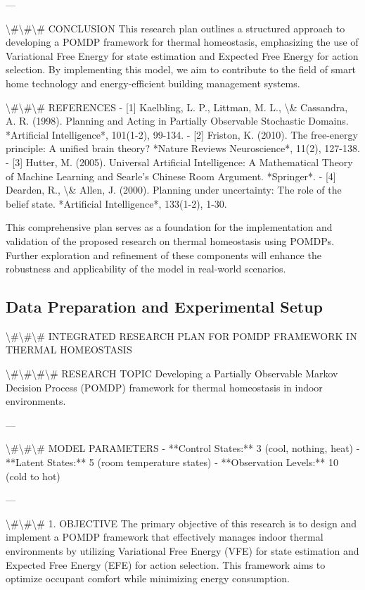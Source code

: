 \documentclass[11pt,a4paper]{article}
\begin{document}
---

\textbackslash{}#\textbackslash{}#\textbackslash{}# CONCLUSION
This research plan outlines a structured approach to developing a POMDP framework for thermal homeostasis, emphasizing the use of Variational Free Energy for state estimation and Expected Free Energy for action selection. By implementing this model, we aim to contribute to the field of smart home technology and energy-efficient building management systems.

\textbackslash{}#\textbackslash{}#\textbackslash{}# REFERENCES
- [1] Kaelbling, L. P., Littman, M. L., \textbackslash{}& Cassandra, A. R. (1998). Planning and Acting in Partially Observable Stochastic Domains. *Artificial Intelligence*, 101(1-2), 99-134.
- [2] Friston, K. (2010). The free-energy principle: A unified brain theory? *Nature Reviews Neuroscience*, 11(2), 127-138.
- [3] Hutter, M. (2005). Universal Artificial Intelligence: A Mathematical Theory of Machine Learning and Searle's Chinese Room Argument. *Springer*.
- [4] Dearden, R., \textbackslash{}& Allen, J. (2000). Planning under uncertainty: The role of the belief state. *Artificial Intelligence*, 133(1-2), 1-30.

This comprehensive plan serves as a foundation for the implementation and validation of the proposed research on thermal homeostasis using POMDPs. Further exploration and refinement of these components will enhance the robustness and applicability of the model in real-world scenarios.
\subsection{Data Preparation and Experimental Setup}

\textbackslash{}#\textbackslash{}#\textbackslash{}# INTEGRATED RESEARCH PLAN FOR POMDP FRAMEWORK IN THERMAL HOMEOSTASIS

\textbackslash{}#\textbackslash{}#\textbackslash{}#\textbackslash{}# RESEARCH TOPIC
Developing a Partially Observable Markov Decision Process (POMDP) framework for thermal homeostasis in indoor environments.

---

\textbackslash{}#\textbackslash{}#\textbackslash{}# MODEL PARAMETERS
- **Control States:** 3 (cool, nothing, heat)
- **Latent States:** 5 (room temperature states)
- **Observation Levels:** 10 (cold to hot)

---

\textbackslash{}#\textbackslash{}#\textbackslash{}# 1. OBJECTIVE
The primary objective of this research is to design and implement a POMDP framework that effectively manages indoor thermal environments by utilizing Variational Free Energy (VFE) for state estimation and Expected Free Energy (EFE) for action selection. This framework aims to optimize occupant comfort while minimizing energy consumption.
\end{document}
